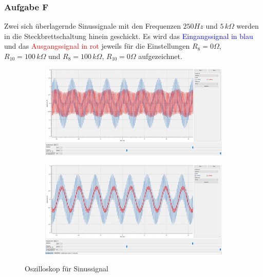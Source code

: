 \subsubsection{Aufgabe F}
\label{F}
Zwei sich überlagernde Sinussignale mit den Frequenzen $\si{250}{Hz}$ und $\si{5}{\,k\Omega}$ werden in die Steckbrettschaltung hinein geschickt. Es wird das \textcolor{blue}{Eingangssignal in blau} und das \textcolor{red}{Ausgangssignal in rot} jeweils für die Einstellungen $R_{8}=\si{0}{\Omega}$, $R_{10}=\si{100}{\,k\Omega}$ und $R_{8}=\si{100}{\,k\Omega}$, $R_{10}=\si{0}{\Omega}$ aufgezeichnet.

\begin{figure}[h]
\centering
\begin{subfigure}{1\textwidth}
\centering
  \includegraphics[width=17cm]{pics/3.3f_0_100}
  \label{sin0_1}
\end{subfigure}
\begin{subfigure}{1\textwidth}
\centering
  \includegraphics[width=17cm]{pics/3.3f_100_0}
  \label{sin1_0}
\end{subfigure}
\caption{Oszilloskop für Sinussignal}
\end{figure}



